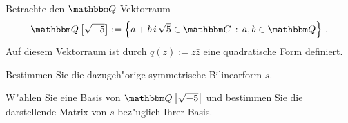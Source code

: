 \documentclass[a4,11pt]{article}
\begin{document}
\vspace*{-17mm}
{
\kopf
}



\begin{aufgabe}[4 Punkte]
  Betrachte den %
  $\Q$-Vektorraum
  $$
  \Q\left[\sqrt{-5}\right] :=  \left\{ a + b\,i\,\sqrt{5} \in \C \suchthat a,b \in \Q \right\} \,.
  $$
  Auf diesem Vektorraum ist durch $q(z) := z \bar z$ eine quadratische Form definiert.

  Bestimmen Sie die dazugeh"orige symmetrische Bilinearform
  $s$.

  W"ahlen Sie eine Basis von $\Q\left[\sqrt{-5}\right]$ und
  bestimmen Sie die darstellende Matrix von $s$ bez"uglich Ihrer
  Basis.
\end{aufgabe}
\end{document}
